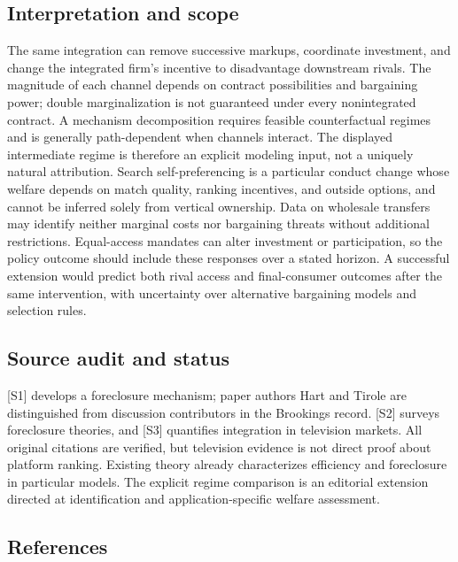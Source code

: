\documentclass[11pt,a4paper]{article}
\begin{document}
\subsection*{Interpretation and scope}

The same integration can remove successive markups, coordinate investment, and change the integrated firm's incentive to disadvantage downstream rivals. The magnitude of each channel depends on contract possibilities and bargaining power; double marginalization is not guaranteed under every nonintegrated contract. A mechanism decomposition requires feasible counterfactual regimes and is generally path-dependent when channels interact. The displayed intermediate regime is therefore an explicit modeling input, not a uniquely natural attribution. Search self-preferencing is a particular conduct change whose welfare depends on match quality, ranking incentives, and outside options, and cannot be inferred solely from vertical ownership. Data on wholesale transfers may identify neither marginal costs nor bargaining threats without additional restrictions. Equal-access mandates can alter investment or participation, so the policy outcome should include these responses over a stated horizon. A successful extension would predict both rival access and final-consumer outcomes after the same intervention, with uncertainty over alternative bargaining models and selection rules.

\subsection*{Source audit and status}

[S1] develops a foreclosure mechanism; paper authors Hart and Tirole are distinguished from discussion contributors in the Brookings record. [S2] surveys foreclosure theories, and [S3] quantifies integration in television markets. All original citations are verified, but television evidence is not direct proof about platform ranking. Existing theory already characterizes efficiency and foreclosure in particular models. The explicit regime comparison is an editorial extension directed at identification and application-specific welfare assessment.

\subsection*{References}
\end{document}
